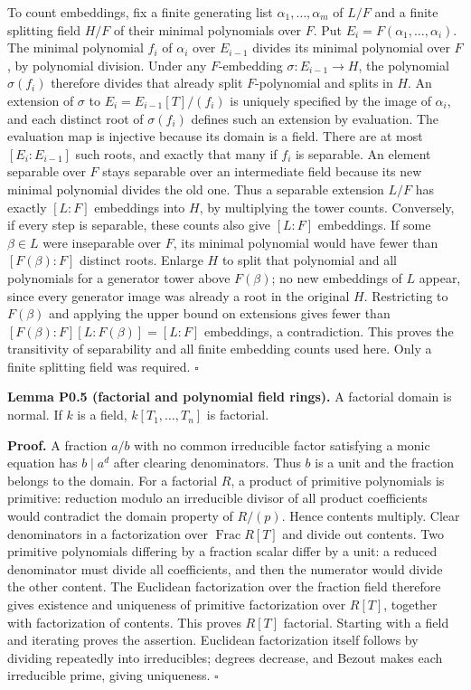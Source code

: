 \documentclass[11pt,a4paper,openany]{report}
\begin{document}
To count embeddings, fix a finite generating list \(\alpha_1,\ldots,\alpha_m\) of \(L/F\) and a finite splitting field \(H/F\) of their minimal polynomials over \(F\). Put \(E_i=F(\alpha_1,\ldots,\alpha_i)\). The minimal polynomial \(f_i\) of \(\alpha_i\) over \(E_{i-1}\) divides its minimal polynomial over \(F\), by polynomial division. Under any \(F\)-embedding \(\sigma:E_{i-1}\to H\), the polynomial \(\sigma(f_i)\) therefore divides that already split \(F\)-polynomial and splits in \(H\). An extension of \(\sigma\) to \(E_i=E_{i-1}[T]/(f_i)\) is uniquely specified by the image of \(\alpha_i\), and each distinct root of \(\sigma(f_i)\) defines such an extension by evaluation. The evaluation map is injective because its domain is a field. There are at most \([E_i:E_{i-1}]\) such roots, and exactly that many if \(f_i\) is separable. An element separable over \(F\) stays separable over an intermediate field because its new minimal polynomial divides the old one. Thus a separable extension \(L/F\) has exactly \([L:F]\) embeddings into \(H\), by multiplying the tower counts. Conversely, if every step is separable, these counts also give \([L:F]\) embeddings. If some \(\beta\in L\) were inseparable over \(F\), its minimal polynomial would have fewer than \([F(\beta):F]\) distinct roots. Enlarge \(H\) to split that polynomial and all polynomials for a generator tower above \(F(\beta)\); no new embeddings of \(L\) appear, since every generator image was already a root in the original \(H\). Restricting to \(F(\beta)\) and applying the upper bound on extensions gives fewer than \([F(\beta):F][L:F(\beta)]=[L:F]\) embeddings, a contradiction. This proves the transitivity of separability and all finite embedding counts used here. Only a finite splitting field was required. \(\square\)

\textbf{Lemma P0.5 (factorial and polynomial field rings).} A factorial domain is normal. If \(k\) is a field, \(k[T_1,\ldots,T_n]\) is factorial.

\textbf{Proof.} A fraction \(a/b\) with no common irreducible factor satisfying a monic equation has \(b\mid a^d\) after clearing denominators. Thus \(b\) is a unit and the fraction belongs to the domain. For a factorial \(R\), a product of primitive polynomials is primitive: reduction modulo an irreducible divisor of all product coefficients would contradict the domain property of \(R/(p)\). Hence contents multiply. Clear denominators in a factorization over \(\operatorname{Frac}R[T]\) and divide out contents. Two primitive polynomials differing by a fraction scalar differ by a unit: a reduced denominator must divide all coefficients, and then the numerator would divide the other content. The Euclidean factorization over the fraction field therefore gives existence and uniqueness of primitive factorization over \(R[T]\), together with factorization of contents. This proves \(R[T]\) factorial. Starting with a field and iterating proves the assertion. Euclidean factorization itself follows by dividing repeatedly into irreducibles; degrees decrease, and Bezout makes each irreducible prime, giving uniqueness. \(\square\)
\end{document}
